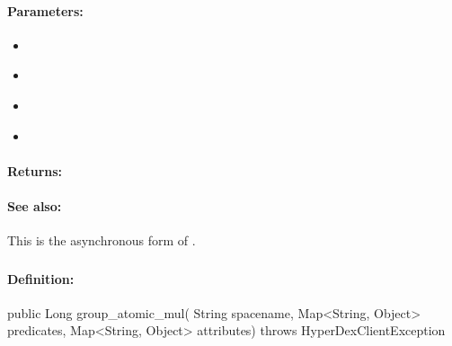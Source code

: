 \paragraph{Parameters:}
\begin{itemize}[noitemsep]
\item {}\\

\item {}\\

\item {}\\

\item {}\\

\end{itemize}

\paragraph{Returns:}


\paragraph{See also:}  This is the asynchronous form of .

\pagebreak
\subsubsection{}
\label{api:java:group_atomic_mul}


\paragraph{Definition:}
\begin{javacode}
public Long group_atomic_mul(
        String spacename,
        Map<String, Object> predicates,
        Map<String, Object> attributes) throws HyperDexClientException
\end{javacode}

